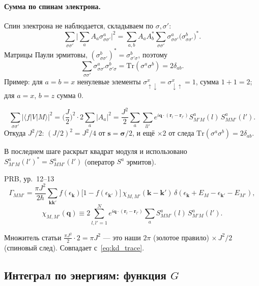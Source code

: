 \paragraph{Сумма по спинам электрона.} Спин электрона не наблюдается,
складываем по $\sigma,\sigma'$:
\[
\sum_{\sigma\sigma'}\Big|\sum_aA_a\sigma^a_{\sigma\sigma'}\Big|^2
=\sum_{a,b}A_aA_b^*\sum_{\sigma\sigma'}\sigma^a_{\sigma\sigma'}\big(\sigma^b_{\sigma\sigma'}\big)^* .
\]
Матрицы Паули эрмитовы, $(\sigma^b_{\sigma\sigma'})^*=\sigma^b_{\sigma'\sigma}$, поэтому
\[
\sum_{\sigma\sigma'}\sigma^a_{\sigma\sigma'}\sigma^b_{\sigma'\sigma}=\mathrm{Tr}(\sigma^a\sigma^b)=2\delta_{ab}.
\]
Пример: для $a=b=x$ ненулевые элементы $\sigma^x_{\uparrow\downarrow}=\sigma^x_{\downarrow\uparrow}=1$, сумма
$1+1=2$; для $a=x$, $b=z$ сумма 0.
\begin{resbox}
\begin{equation}
\sum_{\sigma\sigma'}|\langle f|V|M\rangle|^2
=\Big(\frac J2\Big)^2\cdot2\sum_a|A_a|^2
=\frac{J^2}{2}\sum_a\sum_{ll'}e^{i\mathbf q\cdot(\mathbf r_l-\mathbf r_{l'})}
S^a_{M'M}(l)\,S^a_{MM'}(l').
\label{eq:kd_trace}
\end{equation}
Откуда $J^2/2$: $(J/2)^2=J^2/4$ от $\mathbf s=\boldsymbol\sigma/2$, и ещё $\times2$ от следа
$\mathrm{Tr}(\sigma^a\sigma^b)=2\delta_{ab}$.
\end{resbox}
В последнем шаге раскрыт квадрат модуля и использовано
$S^a_{M'M}(l')^*=S^a_{MM'}(l')$ (оператор $S^a$ эрмитов).

\begin{paperbox}{PRB, ур.~12--13}
\[
\Gamma_{MM'}=\frac{\pi J^2}{2\hbar}\sum_{\mathbf k\mathbf k'}f(\epsilon_{\mathbf k})\big[1-f(\epsilon_{\mathbf k'})\big]\,
\chi_{M,M'}(\mathbf k-\mathbf k')\,\delta(\epsilon_{\mathbf k}+E_M-\epsilon_{\mathbf k'}-E_{M'}),
\]
\[
\chi_{M,M'}(\mathbf q)\equiv2\sum_{l,l'=1}^{N}e^{i\mathbf q\cdot(\mathbf r_l-\mathbf r_{l'})}
\sum_aS^a_{MM'}(l)\,S^a_{M'M}(l').
\]
\end{paperbox}
\begin{cmpbox}
Множитель статьи $\tfrac{\pi J^2}{2}\cdot2=\pi J^2$ --- это наши $2\pi$ (золотое
правило) $\times\,J^2/2$ (спиновый след). Совпадает с~\eqref{eq:kd_trace}.
\end{cmpbox}

\subsection{Интеграл по энергиям: функция $G$}
\label{sec:kd_G}


